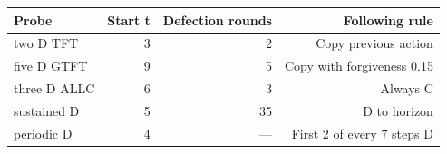 \begin{tabular}{lrrr}
\toprule
Probe & Start t & Defection rounds & Following rule \\
\midrule
two D TFT & 3 & 2 & Copy previous action \\
five D GTFT & 9 & 5 & Copy with forgiveness 0.15 \\
three D ALLC & 6 & 3 & Always C \\
sustained D & 5 & 35 & D to horizon \\
periodic D & 4 & --- & First 2 of every 7 steps D \\
\bottomrule
\end{tabular}
